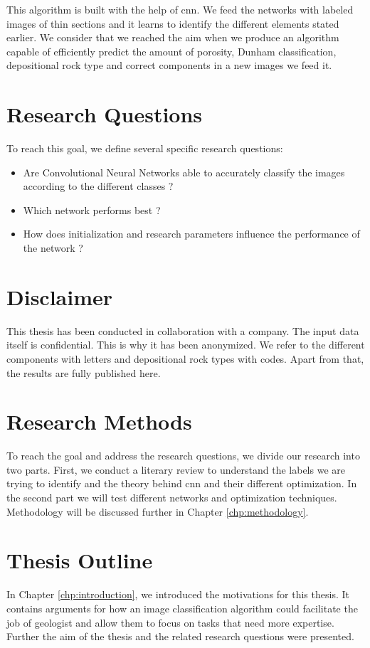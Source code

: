 This algorithm is built with the help of \gls{cnn}. We feed the networks with labeled images of thin sections and it learns to identify the different elements stated earlier. We consider that we reached the aim when we produce an algorithm capable of efficiently predict the amount of porosity, Dunham classification, depositional rock type and correct components in a new images we feed it. 

\section{Research Questions}
To reach this goal, we define several specific research questions: 
\begin{itemize}
    \item Are Convolutional Neural Networks able to accurately classify the images according to the different classes ?
    \item Which network performs best ?
    \item How does initialization and research parameters influence the performance of the network ?
\end{itemize}

\section{Disclaimer}
This thesis has been conducted in collaboration with a company. The input data itself is confidential. This is why it has been anonymized. We refer to the different components with letters and depositional rock types with codes. Apart from that, the results are fully published here.  

\section{Research Methods}\label{sec:research-method}
To reach the goal and address the research questions, we divide our research into two parts. First, we conduct a literary review to understand the labels we are trying to identify and the theory behind \gls{cnn} and their different optimization. In the second part we will test different networks and optimization techniques. Methodology will be discussed further in Chapter \ref{chp:methodology}.
\section{Thesis Outline}

In Chapter \ref{chp:introduction}, we introduced the motivations for this thesis. It contains arguments for how an image classification algorithm could facilitate the job of geologist and allow them to focus on tasks that need more expertise. Further the aim of the thesis and the related research questions were presented. 



